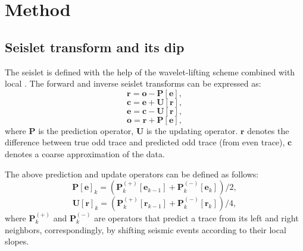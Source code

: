 \section{Method}
\subsection{Seislet transform and its dip }
The seislet is defined with the help of the wavelet-lifting scheme \cite[]{sweldens1995} combined with local  \cite[]{seislet}.%
The forward and inverse seislet transforms can be expressed as:
\begin{equation}
\label{eq:one}
\mathbf{r}=\mathbf{o}-\mathbf{P\left[e\right]},
\end{equation}
\begin{equation}
\label{eq:two}
\mathbf{c}=\mathbf{e}+\mathbf{U\left[r\right]},
\end{equation}
\begin{equation}
\label{eq:three}
\mathbf{e}=\mathbf{c}-\mathbf{U\left[r\right]},
\end{equation}
\begin{equation}
\label{eq:four}
\mathbf{o}=\mathbf{r}+\mathbf{P\left[e\right]},
\end{equation}
where $\mathbf{P}$ is the prediction operator, $\mathbf{U}$ is the updating operator. $\mathbf{r}$ denotes the difference between true odd trace and predicted odd trace (from even trace), $\mathbf{c}$ denotes a coarse approximation of the data. 

The above prediction and update operators can be defined as follows:
\begin{equation}
\label{eq:five}
\mathbf{P}\left[\mathbf{e}\right]_k=\left(\mathbf{P}^{(+)}_k\left[\mathbf{e}_{k-1}\right]+\mathbf{P}^{(-)}_k\left[\mathbf{e}_k\right]\right)/2,
\end{equation}
\begin{equation}
\label{eq:six}
\mathbf{U}\left[\mathbf{r}\right]_k=\left(\mathbf{P}^{(+)}_k\left[\mathbf{r}_{k-1}\right]+\mathbf{P}^{(-)}_k\left[\mathbf{r}_k\right]\right)/4,
\end{equation}
where $\mathbf{P}^{(+)}_k$ and $\mathbf{P}^{(-)}_k$ are operators that predict a trace from its left and right neighbors, correspondingly, by shifting seismic events according to their local slopes. 

